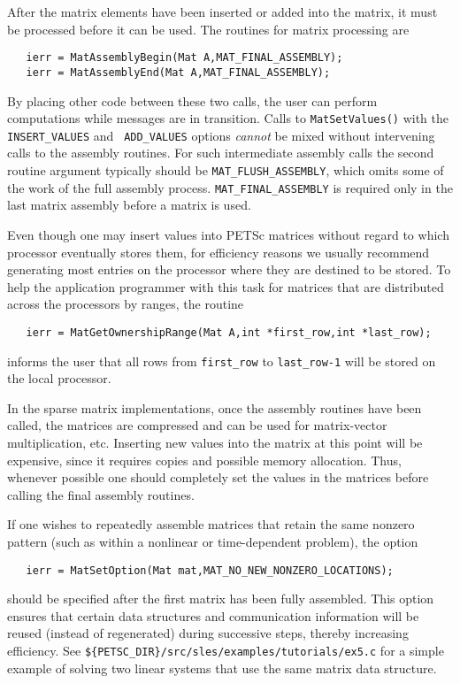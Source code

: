 After the matrix elements have been inserted or added into the matrix, 
it must be processed before it can be used. The routines for matrix
processing are  
\begin{verbatim}
   ierr = MatAssemblyBegin(Mat A,MAT_FINAL_ASSEMBLY);
   ierr = MatAssemblyEnd(Mat A,MAT_FINAL_ASSEMBLY);
\end{verbatim}
By placing other code between these two calls, the user can perform
computations while messages are in transition.
Calls to {\tt MatSetValues()} with the {\tt INSERT\_VALUES} and {\tt
ADD\_VALUES} options {\em cannot} be mixed without intervening calls to
the assembly routines.  For such intermediate assembly calls the
second routine argument  typically should be {\tt MAT\_FLUSH\_ASSEMBLY},
 which omits some of the work of the full 
assembly process.  {\tt MAT\_FINAL\_ASSEMBLY}  is
required only in the last matrix assembly before a matrix is used.

Even though one may insert values into PETSc matrices without regard
to which processor eventually stores them, for efficiency
reasons we usually recommend generating most entries on the
processor where they are destined to be stored.  To help the
application programmer with this task for matrices that are
distributed across the processors by ranges, the routine
\begin{verbatim}
   ierr = MatGetOwnershipRange(Mat A,int *first_row,int *last_row);
\end{verbatim}
informs the user that all rows from {\tt first\_row} to 
{\tt last\_row-1} will be stored on the local processor.

In the sparse matrix implementations, once the assembly routines have been 
called, the matrices are compressed and can be used for matrix-vector
multiplication, etc.
Inserting new values into the matrix at this point will be expensive, 
since it requires copies and possible memory allocation. Thus, whenever 
possible one should completely set the values in the matrices before 
calling the final assembly routines. 

If one wishes to repeatedly assemble matrices that retain the same
nonzero pattern (such as within a nonlinear or time-dependent
problem), the option
\begin{verbatim}
   ierr = MatSetOption(Mat mat,MAT_NO_NEW_NONZERO_LOCATIONS);
\end{verbatim}
should be specified after the first matrix has been fully assembled.
This option ensures that certain data structures and communication
information will be reused (instead of regenerated) during successive
steps, thereby increasing efficiency.  
See {\tt \$\{PETSC\_DIR\}/src/sles/examples/tutorials/ex5.c} for a simple example of
solving two linear systems that use the same matrix data structure.

